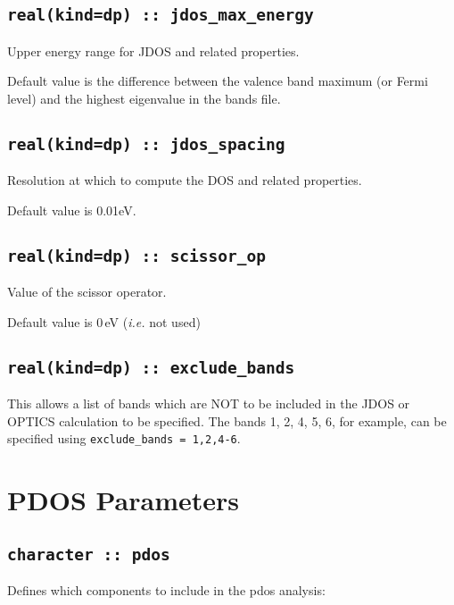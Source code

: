\documentclass[a4paper,11pt,twoside]{book}
\begin{document}
{\subsection[jdos\_max\_energy]{\tt real(kind=dp) :: jdos\_max\_energy}
Upper energy range for JDOS and related properties.

Default value is the difference between the valence band maximum (or
Fermi level) and the highest eigenvalue in the bands file.

\subsection[jdos\_spacing]{\tt real(kind=dp) :: jdos\_spacing}
Resolution at which to compute the DOS and related properties.

Default value is 0.01eV.

\subsection[scissor\_op]{\tt real(kind=dp) :: scissor\_op}
Value of the scissor operator.

Default value is 0\,eV (\emph{i.e.} not used)

\subsection[exclude\_bands]{\tt real(kind=dp) :: exclude\_bands}
This allows a list of bands which are NOT to be included in the JDOS or OPTICS calculation to be specified.  The bands 1, 2, 4, 5, 6, for example, can be specified using \verb#exclude_bands = 1,2,4-6#.

\section{PDOS Parameters}

\subsection[pdos]{\tt character :: pdos}
Defines which components to include in the pdos analysis:

}
\end{document}
